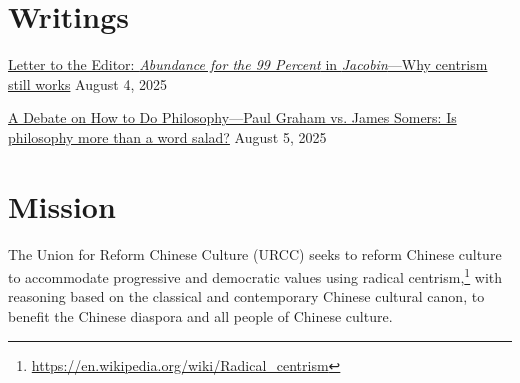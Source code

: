 \documentclass[12pt]{article}
\begin{document}

\section{Writings}

\href{202508Abundance.html}{Letter to the Editor: \textit{Abundance for the 99 Percent} in \textit{Jacobin}---Why centrism still works} August 4, 2025

\href{202508DebateOnPhilosophyPaulGrahamPG.html}{A Debate on How to Do
Philosophy---Paul Graham vs. James Somers: Is philosophy more than a word salad?} August 5, 2025

\section{Mission}

The Union for Reform Chinese Culture (URCC) seeks to reform Chinese culture to accommodate progressive and democratic values using radical centrism,\footnote{\href{https://en.wikipedia.org/wiki/Radical\_centrism}{https://en.wikipedia.org/wiki/Radical\_centrism}} with reasoning based on the classical and contemporary Chinese cultural canon, to benefit the Chinese diaspora and all people of Chinese culture.




\end{document}
